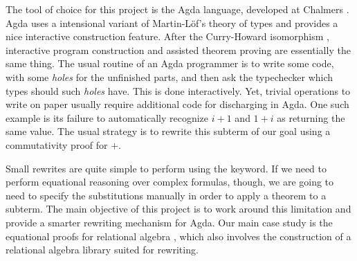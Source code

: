 The tool of choice for this project is the Agda language, developed at Chalmers \cite{norell07}. Agda uses a intensional
variant of Martin-L\"{o}f's theory of types and provides a nice interactive construction feature. After
the Curry-Howard isomorphism \cite{Howard01}, interactive program construction and assisted theorem proving are essentially
the same thing. The usual routine of an Agda programmer is to write some code, with some \emph{holes} for
the unfinished parts, and then ask the typechecker which types should such \emph{holes} have. This is done
interactively. Yet, trivial operations to write on paper usually require additional code
for discharging in Agda. One such example is its failure to automatically recognize $i + 1$ and
$1 + i$ as returning the same value. The usual strategy is to rewrite this subterm of our goal
using a commutativity proof for $+$. 

Small rewrites are quite simple to perform using the  keyword. If we need to perform
equational reasoning over complex formulas, though, we are going to need to specify the
substitutions manually in order to apply a theorem to a subterm. The main objective of this project is
to work around this limitation and provide a smarter rewriting mechanism for Agda. Our main 
case study is the equational proofs for relational algebra \cite{Bird97}, which also involves
the construction of a relational algebra library suited for rewriting.
